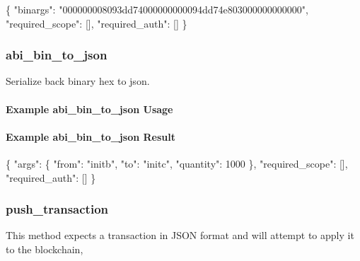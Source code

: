 \begin{DoxyCode}
\{
  \textcolor{stringliteral}{"binargs"}: \textcolor{stringliteral}{"000000008093dd74000000000094dd74e803000000000000"},
  \textcolor{stringliteral}{"required\_scope"}: [],
  \textcolor{stringliteral}{"required\_auth"}: []
\}
\end{DoxyCode}
\hypertarget{group__aaciorpc_v1chaingeabibintojson}{}\subsubsection{abi\+\_\+bin\+\_\+to\+\_\+json}\label{group__aaciorpc_v1chaingeabibintojson}
Serialize back binary hex to json.\hypertarget{group__aaciorpc_exampleabibintojson}{}\paragraph{Example abi\+\_\+bin\+\_\+to\+\_\+json Usage}\label{group__aaciorpc_exampleabibintojson}

\hypertarget{group__aaciorpc_exampleabibintojsonresult}{}\paragraph{Example abi\+\_\+bin\+\_\+to\+\_\+json Result}\label{group__aaciorpc_exampleabibintojsonresult}

\begin{DoxyCode}
\{
  \textcolor{stringliteral}{"args"}: \{
    \textcolor{stringliteral}{"from"}: \textcolor{stringliteral}{"initb"},
    \textcolor{stringliteral}{"to"}: \textcolor{stringliteral}{"initc"},
    \textcolor{stringliteral}{"quantity"}: 1000
  \},
  \textcolor{stringliteral}{"required\_scope"}: [],
  \textcolor{stringliteral}{"required\_auth"}: []
\}
\end{DoxyCode}
\hypertarget{group__aaciorpc_v1chainpushtransaction}{}\subsubsection{push\+\_\+transaction}\label{group__aaciorpc_v1chainpushtransaction}
This method expects a transaction in J\+S\+ON format and will attempt to apply it to the blockchain,

